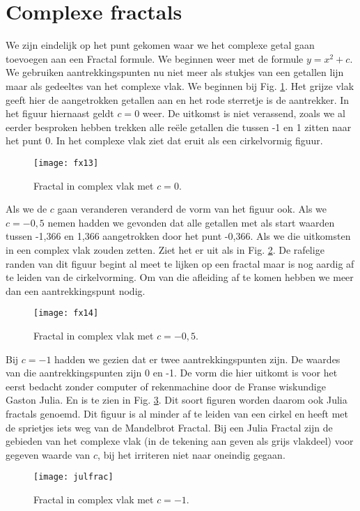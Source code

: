 \documentclass[11pt,fleqn]{book} %
\begin{document}
\section{Complexe fractals}
We zijn eindelijk op het punt gekomen waar we het complexe getal gaan toevoegen aan een Fractal formule. We beginnen weer met de formule $y=x^2+c$. We gebruiken aantrekkingspunten nu niet meer als stukjes van een getallen lijn maar als gedeeltes van het complexe vlak. We beginnen bij Fig. \ref{fig:fx13}. Het grijze vlak geeft hier de aangetrokken getallen aan en het rode sterretje is de aantrekker. In het figuur hiernaast geldt $c=0$ weer. De uitkomst is niet verassend, zoals we al eerder besproken hebben trekken alle reële getallen die tussen -1 en 1 zitten naar het punt 0. In het complexe vlak ziet dat eruit als een cirkelvormig figuur.
\begin{figure}[h]
	\centering\texttt{[image: fx13]}
	\caption{Fractal in complex vlak met $c=0$.}
	\label{fig:fx13}
\end{figure}
Als we de $c$ gaan veranderen veranderd de vorm van het figuur ook. Als we $c=-0,5$ nemen hadden we gevonden dat alle getallen met als start waarden tussen -1,366 en 1,366 aangetrokken door het punt -0,366. Als we die uitkomsten in een complex vlak zouden zetten. Ziet het er uit als in Fig. \ref{fig:fx14}. De rafelige randen van dit figuur begint al meet te lijken op een fractal maar is nog aardig af te leiden van de cirkelvorming.
Om van die afleiding af te komen hebben we meer dan een aantrekkingspunt nodig. 
\begin{figure}[h]
	\centering\texttt{[image: fx14]}
	\caption{Fractal in complex vlak met $c=-0,5$.}
	\label{fig:fx14}
\end{figure}
Bij $c=-1$ hadden we gezien dat er twee aantrekkingspunten zijn. De waardes van die aantrekkingspunten zijn 0 en -1. De vorm die hier uitkomt is voor het eerst bedacht zonder computer of rekenmachine door de Franse wiskundige Gaston Julia. En is te zien in Fig. \ref{fig:julfrac}. Dit soort figuren worden daarom ook Julia fractals genoemd. Dit figuur is al minder af te leiden van een cirkel en heeft met de sprietjes iets weg van de Mandelbrot Fractal.
Bij een Julia Fractal zijn de gebieden van het complexe vlak (in de tekening aan geven als grijs vlakdeel) voor gegeven waarde van $c$, bij het irriteren niet naar oneindig gegaan.
\begin{figure}[h]
	\centering\texttt{[image: julfrac]}
	\caption{Fractal in complex vlak met $c=-1$.}
	\label{fig:julfrac}
\end{figure}
\end{document}
